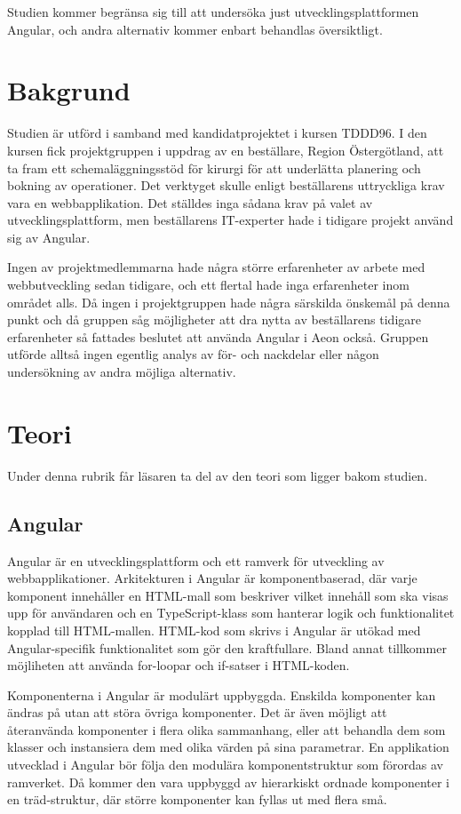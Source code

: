 Studien kommer begränsa sig till att undersöka just utvecklingsplattformen Angular, och andra alternativ kommer enbart behandlas översiktligt.

\section{Bakgrund}


Studien är utförd i samband med kandidatprojektet i kursen TDDD96. I den kursen fick projektgruppen i uppdrag av en beställare, Region Östergötland, att ta fram ett schemaläggningsstöd för kirurgi för att underlätta planering och bokning av operationer. Det verktyget skulle enligt beställarens uttryckliga krav vara en webbapplikation. Det ställdes inga sådana krav på valet av utvecklingsplattform, men beställarens IT-experter hade i tidigare projekt använd sig av Angular. 

Ingen av projektmedlemmarna hade några större erfarenheter av arbete med webbutveckling sedan tidigare, och ett flertal hade inga erfarenheter inom området alls. Då ingen i projektgruppen hade några särskilda önskemål på denna punkt och då gruppen såg möjligheter att dra nytta av beställarens tidigare erfarenheter så fattades beslutet att använda Angular i Aeon också. Gruppen utförde alltså ingen egentlig analys av för- och nackdelar eller någon undersökning av andra möjliga alternativ.  

\section{Teori}

Under denna rubrik får läsaren ta del av den teori som ligger bakom studien.

\subsection{Angular} \label{martin_angular}

Angular är en utvecklingsplattform och ett ramverk för utveckling av webbapplikationer. Arkitekturen i Angular är komponentbaserad, där varje komponent innehåller en HTML-mall som beskriver vilket innehåll som ska visas upp för användaren och en TypeScript-klass som hanterar logik och funktionalitet kopplad till HTML-mallen. HTML-kod som skrivs i Angular är utökad med Angular-specifik funktionalitet som gör den kraftfullare. Bland annat tillkommer möjliheten att använda for-loopar och if-satser i HTML-koden.

Komponenterna i Angular är modulärt uppbyggda. Enskilda komponenter kan ändras på utan att störa övriga komponenter. Det är även möjligt att återanvända komponenter i flera olika sammanhang, eller att behandla dem som klasser och instansiera dem med olika värden på sina parametrar. En applikation utvecklad i Angular bör följa den modulära komponentstruktur som förordas av ramverket. Då kommer den vara uppbyggd av hierarkiskt ordnade komponenter i en träd-struktur, där större komponenter kan fyllas ut med flera små.   

